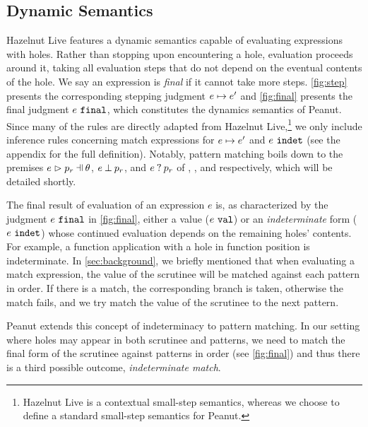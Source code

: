 \subsection{Dynamic Semantics}\label{sec:dynamics}




Hazelnut Live \cite{DBLP:journals/pacmpl/OmarVCH19} features a dynamic semantics capable of evaluating expressions with holes.
Rather than stopping upon encountering a hole, evaluation proceeds around it, taking all evaluation steps that do not depend on the eventual contents of the hole. We say an expression is \textit{final} if it cannot take more steps.
\autoref{fig:step} presents the corresponding stepping judgment $e \mapsto e'$ and \autoref{fig:final} presents the final judgment $e ~\mathtt{final}$, which constitutes the dynamics semantics of Peanut. Since many of the rules are directly adapted from Hazelnut Live,\footnote{Hazelnut Live is a contextual small-step semantics, whereas we choose to define a standard small-step semantics for Peanut.} we only include inference rules concerning match expressions for $e \mapsto e'$ and $e ~\mathtt{indet}$ (see the appendix for the full definition). 
Notably, pattern matching boils down to the premises $\hpatmatch{e}{p_r}{\theta}$, $e \mathbin{\bot} p_r$, and $e \mathbin{?} p_r$ of \ITSuccMatch, \ITFailMatch, and \IMatch respectively, which will be detailed shortly.

The final result of evaluation of an expression $e$ is, as characterized by the judgment $e ~\mathtt{final}$ in \autoref{fig:final}, either a value ($e ~\mathtt{val}$) or an \emph{indeterminate} form ($e ~\mathtt{indet}$) whose continued evaluation depends on the remaining holes' contents. For example, a function application with a hole in function position is indeterminate. 
In \autoref{sec:background}, we briefly mentioned that when evaluating a match expression, the value of the scrutinee will be matched against each pattern in order. If there is a match, the corresponding branch is taken, otherwise the match fails, and we try match the value of the scrutinee to the next pattern. 

Peanut extends this concept of indeterminacy to pattern matching.
In our setting where holes may appear in both scrutinee and patterns, we need to match the final form of the scrutinee against patterns in order (see \autoref{fig:final}) and thus there is a third possible outcome, \textit{indeterminate match}.

